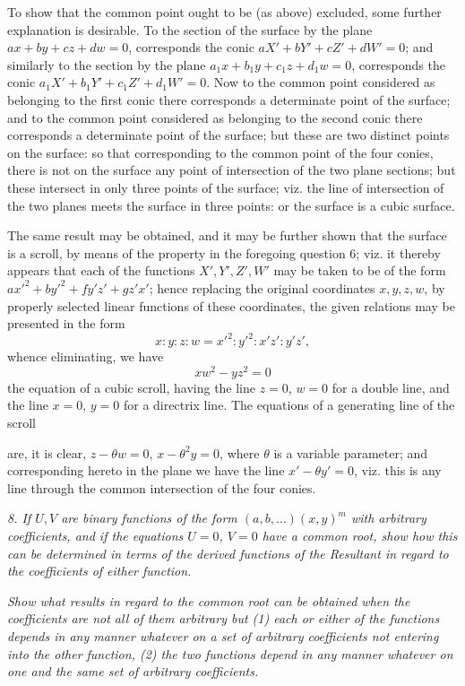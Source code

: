 \documentclass[11pt,a4paper]{article}
\theoremstyle{plain}
\theoremstyle{definition}
\begin{document}
To show that the common point ought to be (as above) excluded, some further explanation is desirable. To the section of the surface by the plane $ax+by+cz+dw=0$, corresponds the conic $aX'+bY'+cZ'+dW'=0$; and similarly to the section by the plane $a_1x+b_1y+c_1z+d_1w=0$, corresponds the conic $a_1X'+b_1Y'+c_1Z'+d_1W'=0$. Now to the common point considered as belonging to the first conic there corresponds a determinate point of the surface; and to the common point considered as belonging to the second conic there corresponds a determinate point of the surface; but these are two distinct points on the surface: so that corresponding to the common point of the four conies, there is not on the surface any point of intersection of the two plane sections; but these intersect in only three points of the surface; viz. the line of intersection of the two planes meets the surface in three points: or the surface is a cubic surface.

The same result may be obtained, and it may be further shown that the surface is a scroll, by means of the property in the foregoing question 6; viz. it thereby appears that each of the functions $X',Y',Z',W'$ may be taken to be of the form $ax'^2+by'^2+fy'z'+gz'x'$; hence replacing the original coordinates $x,y,z,w$, by properly selected linear functions of these coordinates, the given relations may be presented in the form
\[
x:y:z:w=x'^2:y'^2:x'z':y'z',
\]
whence eliminating, we have
\[
xw^2-yz^2=0
\]
the equation of a cubic scroll, having the line $z=0$, $w=0$ for a double line, and the line $x=0$, $y=0$ for a directrix line. The equations of a generating line of the scroll

\newpage

are, it is clear, $z-\theta w=0$, $x-\theta^2y=0$, where $\theta$ is a variable parameter; and corresponding hereto in the plane we have the line $x'-\theta y'=0$, viz. this is any line through the common intersection of the four conies.

\medskip
\noindent\textit{8. If $U,V$ are binary functions of the form $(a,b,\ldots)(x,y)^m$ with arbitrary coefficients, and if the equations $U=0$, $V=0$ have a common root, show how this can be determined in terms of the derived functions of the Resultant in regard to the coefficients of either function.}

\textit{Show what results in regard to the common root can be obtained when the coefficients are not all of them arbitrary but (1) each or either of the functions depends in any manner whatever on a set of arbitrary coefficients not entering into the other function, (2) the two functions depend in any manner whatever on one and the same set of arbitrary coefficients.}
\end{document}
